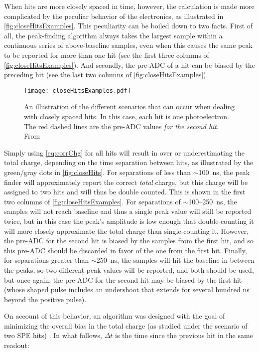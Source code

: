 \documentclass[../thesis.tex]{subfiles}
\begin{document}
When hits are more closely spaced in time, however, the calculation is made more complicated by the peculiar behavior of the electronics, as illustrated in \autoref{fig:closeHitsExamples}. This peculiarity can be boiled down to two facts. First of all, the peak-finding algorithm always takes the largest sample within a continuous series of above-baseline samples, even when this causes the same peak to be reported for more than one hit (see the first three columns of \autoref{fig:closeHitsExamples}). And secondly, the pre-ADC of a hit can be biased by the preceding hit (see the last two columns of \autoref{fig:closeHitsExamples}). 

\begin{figure}[ht]
  \texttt{[image: closeHitsExamples.pdf]}
  \caption{An illustration of the different scenarios that can occur when dealing with closely spaced hits. In this case, each hit is one photoelectron. The red dashed lines are the pre-ADC values \emph{for the second hit}. From \cite{closeHits}}
  \label{fig:closeHitsExamples}
\end{figure}

Simply using \eqref{eq:corrChg} for all hits will result in over or underestimating the total charge, depending on the time separation between hits, as illustrated by the green/gray dots in \autoref{fig:closeHits}. For separations of less than $\sim$100~ns, the peak finder will approximately report the correct \emph{total} charge, but this charge will be assigned to two hits and will thus be double counted. This is shown in the first two columns of \autoref{fig:closeHitsExamples}. For separations of $\sim$100--250~ns, the samples will not reach baseline and thus a single peak value will still be reported twice, but in this case the peak's amplitude is low enough that double-counting it will more closely approximate the total charge than single-counting it. However, the pre-ADC for the second hit is biased by the samples from the first hit, and so this pre-ADC should be discarded in favor of the one from the first hit. Finally, for separations greater than $\sim$250~ns, the samples will hit the baseline in between the peaks, so two different peak values will be reported, and both should be used, but once again, the pre-ADC for the second hit may be biased by the first hit (whose shaped pulse includes an undershoot that extends for several hundred ns beyond the positive pulse).

On account of this behavior, an algorithm was designed with the goal of minimizing the overall bias in the total charge (as studied under the scenario of two SPE hits) \cite{closeHits}. In what follows, $\Delta t$ is the time since the previous hit in the same readout:
\end{document}
